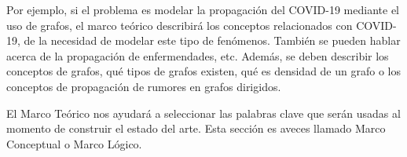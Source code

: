 \begin{tcolorbox}[colback=blue!5!white,colframe=blue!75!black,title=Ejemplo]
Por ejemplo, si el problema es modelar la propagación del COVID-19 mediante el uso de grafos, el marco teórico describirá los conceptos relacionados con COVID-19, de la necesidad de modelar este tipo de fenómenos. También se pueden hablar acerca de la propagación de enfermendades, etc. Además, se deben describir los conceptos de grafos, qué tipos de grafos existen, qué es densidad de un grafo o los conceptos de propagación de rumores en grafos dirigidos.
\end{tcolorbox}

El Marco Teórico nos ayudará a seleccionar las palabras clave que serán usadas al momento de construir el estado del arte.
Esta sección es aveces llamado Marco Conceptual o Marco Lógico.
